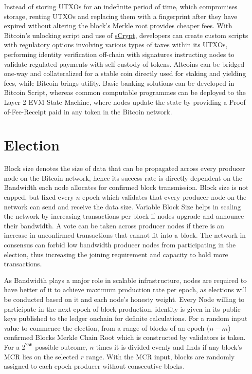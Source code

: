 \documentclass[a4paper,10pt]{article}
\begin{document}
Instead of storing UTXOs for an indefinite period of time, which compromises storage, renting UTXOs and replacing them with a fingerprint after they have expired without altering the block’s Merkle root provides cheaper fees. With Bitcoin’s unlocking script and use of \href{https://scrypt.io}{sCrypt}, developers can create custom scripts with regulatory options involving various types of taxes within its UTXOs, performing identity verification off-chain with signatures instructing nodes to validate regulated payments with self-custody of tokens. Altcoins can be bridged one-way and collateralized for a stable coin directly used for staking and yielding fees, while Bitcoin brings utility. Basic banking solutions can be developed in Bitcoin Script, whereas common computable programmes can be deployed to the Layer 2 EVM State Machine, where nodes update the state by providing a Proof-of-Fee-Receipt paid in any token in the Bitcoin network. 
\section{Election}
Block size denotes the size of data that can be propagated across every producer node on the Bitcoin network, hence its success rate is directly dependent on the Bandwidth each node allocates for confirmed block transmission. Block size is not capped, but fixed every $n$ epoch which validates that every producer node on the network can send and receive the data size. Variable Block Size helps in scaling the network by increasing transactions per block if nodes upgrade and announce their bandwidth. A vote can be taken across producer nodes if there is an increase in unconfirmed transactions that cannot fit into a block. The network in consensus can forbid low bandwidth producer nodes from participating in the election, thus increasing the joining requirement and capacity to hold more transactions. 

As Bandwidth plays a major role in scalable infrastructure, nodes are required to have better of it to achieve maximum production rate per epoch, as elections will be conducted based on it and each node's honesty weight. Every Node willing to participate in the next epoch of block production, identity is given in its public keys published to the ledger onchain for definite calculations. For a random input value to commence the election, from a range of blocks of an epoch ($n-m$) confirmed Blocks Merkle Chain Root which is constructed by validators is taken. For a $2^{256}$ possible outcome, $n$ times it is divided evenly and finds if any block's MCR lies on the selected $r$ range. With the MCR input, blocks are randomly assigned to each epoch producer without consecutive blocks. 
\end{document}
